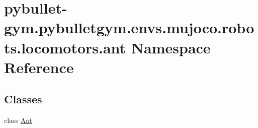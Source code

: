 \hypertarget{namespacepybullet-gym_1_1pybulletgym_1_1envs_1_1mujoco_1_1robots_1_1locomotors_1_1ant}{}\section{pybullet-\/gym.pybulletgym.\+envs.\+mujoco.\+robots.\+locomotors.\+ant Namespace Reference}
\label{namespacepybullet-gym_1_1pybulletgym_1_1envs_1_1mujoco_1_1robots_1_1locomotors_1_1ant}
\subsection*{Classes}
\begin{DoxyCompactItemize}
\item 
class \hyperlink{classpybullet-gym_1_1pybulletgym_1_1envs_1_1mujoco_1_1robots_1_1locomotors_1_1ant_1_1_ant}{Ant}
\end{DoxyCompactItemize}
